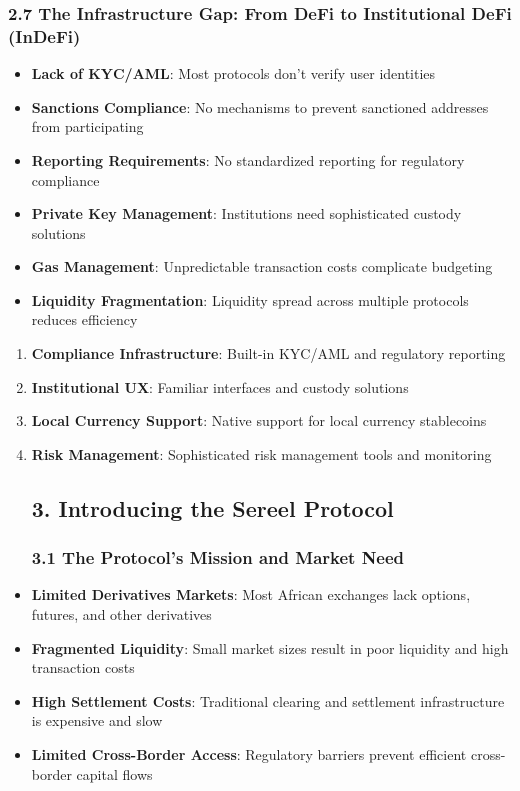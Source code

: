 \documentclass[12pt]{article}
\begin{document}
{{{\begin{enumerate}
\subsubsection{2.7 The Infrastructure Gap: From DeFi to Institutional DeFi (InDeFi)} %

\end{enumerate}
\begin{itemize}
	\item \textbf{Lack of KYC/AML}: Most protocols don't verify user identities
	\item \textbf{Sanctions Compliance}: No mechanisms to prevent sanctioned addresses from participating
	\item \textbf{Reporting Requirements}: No standardized reporting for regulatory compliance
	\item \textbf{Private Key Management}: Institutions need sophisticated custody solutions
	\item \textbf{Gas Management}: Unpredictable transaction costs complicate budgeting
	\item \textbf{Liquidity Fragmentation}: Liquidity spread across multiple protocols reduces efficiency

\end{itemize}
\begin{enumerate}
	\item \textbf{Compliance Infrastructure}: Built-in KYC/AML and regulatory reporting
	\item \textbf{Institutional UX}: Familiar interfaces and custody solutions
	\item \textbf{Local Currency Support}: Native support for local currency stablecoins
	\item \textbf{Risk Management}: Sophisticated risk management tools and monitoring
\subsection{3. Introducing the Sereel Protocol} %
\subsubsection{3.1 The Protocol's Mission and Market Need} %

\end{enumerate}
\begin{itemize}
	\item \textbf{Limited Derivatives Markets}: Most African exchanges lack options, futures, and other derivatives
	\item \textbf{Fragmented Liquidity}: Small market sizes result in poor liquidity and high transaction costs
	\item \textbf{High Settlement Costs}: Traditional clearing and settlement infrastructure is expensive and slow
	\item \textbf{Limited Cross-Border Access}: Regulatory barriers prevent efficient cross-border capital flows

\end{itemize}}}}
\end{document}
